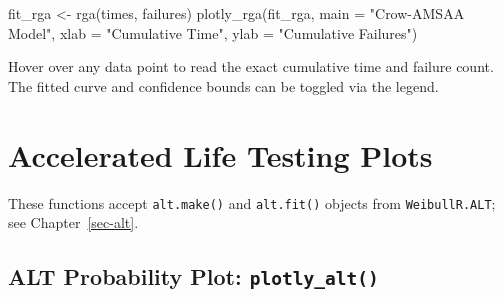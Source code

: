 \documentclass[
  letterpaper,
  DIV=11,
  numbers=noendperiod]{scrreprt}
\newenvironment{Shaded}{\begin{snugshade}}{\end{snugshade}}
\newcommand{\AttributeTok}[1]{\textcolor[rgb]{0.40,0.45,0.13}{#1}}
\newcommand{\FunctionTok}[1]{\textcolor[rgb]{0.28,0.35,0.67}{#1}}
\newcommand{\NormalTok}[1]{\textcolor[rgb]{0.00,0.23,0.31}{#1}}
\newcommand{\OtherTok}[1]{\textcolor[rgb]{0.00,0.23,0.31}{#1}}
\newcommand{\StringTok}[1]{\textcolor[rgb]{0.13,0.47,0.30}{#1}}
\begin{document}
\begin{Shaded}
\begin{Highlighting}[]
\NormalTok{fit\_rga }\OtherTok{\textless{}{-}} \FunctionTok{rga}\NormalTok{(times, failures)}
\FunctionTok{plotly\_rga}\NormalTok{(fit\_rga,}
           \AttributeTok{main =} \StringTok{"Crow{-}AMSAA Model"}\NormalTok{,}
           \AttributeTok{xlab =} \StringTok{"Cumulative Time"}\NormalTok{,}
           \AttributeTok{ylab =} \StringTok{"Cumulative Failures"}\NormalTok{)}
\end{Highlighting}
\end{Shaded}

Hover over any data point to read the exact cumulative time and failure
count. The fitted curve and confidence bounds can be toggled via the
legend.

\section{Accelerated Life Testing
Plots}\label{accelerated-life-testing-plots}

These functions accept \texttt{alt.make()} and \texttt{alt.fit()}
objects from \texttt{WeibullR.ALT}; see Chapter~\ref{sec-alt}.

\subsection{\texorpdfstring{ALT Probability Plot:
\texttt{plotly\_alt()}}{ALT Probability Plot: plotly\_alt()}}\label{alt-probability-plot-plotly_alt}
\end{document}
